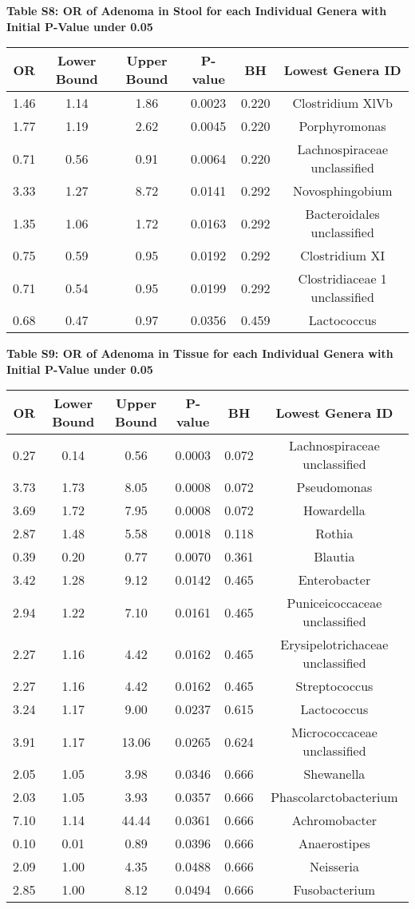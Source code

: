 \documentclass[12pt,]{article}
\begin{document}
\newpage

\textbf{Table S8: OR of Adenoma in Stool for each Individual Genera with
Initial P-Value under 0.05}

\begin{longtable}[]{@{}cccccc@{}}
\toprule
OR & Lower Bound & Upper Bound & P-value & BH & Lowest Genera
ID\tabularnewline
\midrule
\endhead
1.46 & 1.14 & 1.86 & 0.0023 & 0.220 & Clostridium XlVb\tabularnewline
1.77 & 1.19 & 2.62 & 0.0045 & 0.220 & Porphyromonas\tabularnewline
0.71 & 0.56 & 0.91 & 0.0064 & 0.220 & Lachnospiraceae
unclassified\tabularnewline
3.33 & 1.27 & 8.72 & 0.0141 & 0.292 & Novosphingobium\tabularnewline
1.35 & 1.06 & 1.72 & 0.0163 & 0.292 & Bacteroidales
unclassified\tabularnewline
0.75 & 0.59 & 0.95 & 0.0192 & 0.292 & Clostridium XI\tabularnewline
0.71 & 0.54 & 0.95 & 0.0199 & 0.292 & Clostridiaceae 1
unclassified\tabularnewline
0.68 & 0.47 & 0.97 & 0.0356 & 0.459 & Lactococcus\tabularnewline
\bottomrule
\end{longtable}

\newpage

\textbf{Table S9: OR of Adenoma in Tissue for each Individual Genera
with Initial P-Value under 0.05}

\begin{longtable}[]{@{}cccccc@{}}
\toprule
OR & Lower Bound & Upper Bound & P-value & BH & Lowest Genera
ID\tabularnewline
\midrule
\endhead
0.27 & 0.14 & 0.56 & 0.0003 & 0.072 & Lachnospiraceae
unclassified\tabularnewline
3.73 & 1.73 & 8.05 & 0.0008 & 0.072 & Pseudomonas\tabularnewline
3.69 & 1.72 & 7.95 & 0.0008 & 0.072 & Howardella\tabularnewline
2.87 & 1.48 & 5.58 & 0.0018 & 0.118 & Rothia\tabularnewline
0.39 & 0.20 & 0.77 & 0.0070 & 0.361 & Blautia\tabularnewline
3.42 & 1.28 & 9.12 & 0.0142 & 0.465 & Enterobacter\tabularnewline
2.94 & 1.22 & 7.10 & 0.0161 & 0.465 & Puniceicoccaceae
unclassified\tabularnewline
2.27 & 1.16 & 4.42 & 0.0162 & 0.465 & Erysipelotrichaceae
unclassified\tabularnewline
2.27 & 1.16 & 4.42 & 0.0162 & 0.465 & Streptococcus\tabularnewline
3.24 & 1.17 & 9.00 & 0.0237 & 0.615 & Lactococcus\tabularnewline
3.91 & 1.17 & 13.06 & 0.0265 & 0.624 & Micrococcaceae
unclassified\tabularnewline
2.05 & 1.05 & 3.98 & 0.0346 & 0.666 & Shewanella\tabularnewline
2.03 & 1.05 & 3.93 & 0.0357 & 0.666 &
Phascolarctobacterium\tabularnewline
7.10 & 1.14 & 44.44 & 0.0361 & 0.666 & Achromobacter\tabularnewline
0.10 & 0.01 & 0.89 & 0.0396 & 0.666 & Anaerostipes\tabularnewline
2.09 & 1.00 & 4.35 & 0.0488 & 0.666 & Neisseria\tabularnewline
2.85 & 1.00 & 8.12 & 0.0494 & 0.666 & Fusobacterium\tabularnewline
\bottomrule
\end{longtable}
\end{document}
